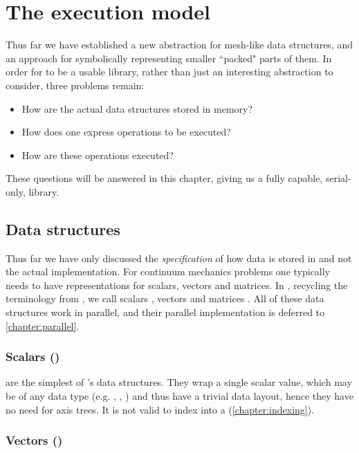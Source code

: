\documentclass[thesis]{subfiles}
\begin{document}
\chapter{The execution model}
\label{chapter:execution_model}

Thus far we have established a new abstraction for mesh-like data structures, and an approach for symbolically representing smaller ``packed" parts of them.
In order for  to be a usable library, rather than just an interesting abstraction to consider, three problems remain:

\begin{itemize}
  \item How are the actual data structures stored in memory?
  \item How does one express operations to be executed?
  \item How are these operations executed?
\end{itemize}

These questions will be answered in this chapter, giving us a fully capable, serial-only,  library.

\section{Data structures}
\label{sec:data_structures}

Thus far we have only discussed the \textit{specification} of how data is stored in  and not the actual implementation.
For continuum mechanics problems one typically needs to have representations for scalars, vectors and matrices.
In , recycling the terminology from , we call scalars , vectors  and matrices .
All of these data structures work in parallel, and their parallel implementation is deferred to \cref{chapter:parallel}.

\subsection{Scalars ()}

 are the simplest of 's data structures.
They wrap a single scalar value, which may be of any data type (e.g. , , ) and thus have a trivial data layout, hence they have no need for axis trees.
It is not valid to index into a  (\cref{chapter:indexing}).

\subsection{Vectors ()}
\end{document}
